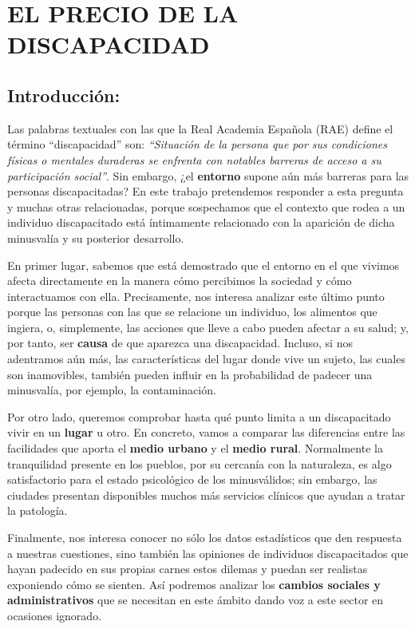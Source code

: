 \documentclass[
]{article}
\begin{document}
\hypertarget{el-precio-de-la-discapacidad}{%
\section{EL PRECIO DE LA
DISCAPACIDAD}\label{el-precio-de-la-discapacidad}}

\hypertarget{introducciuxf3n}{%
\subsection{Introducción:}\label{introducciuxf3n}}

Las palabras textuales con las que la Real Academia Española (RAE)
define el término ``discapacidad'' son: \emph{``Situación de la persona
que por sus condiciones físicas o mentales duraderas se enfrenta con
notables barreras de acceso a su participación social''}. Sin embargo,
¿el \textbf{entorno} supone aún más barreras para las personas
discapacitadas? En este trabajo pretendemos responder a esta pregunta y
muchas otras relacionadas, porque sospechamos que el contexto que rodea
a un individuo discapacitado está íntimamente relacionado con la
aparición de dicha minusvalía y su posterior desarrollo.

En primer lugar, sabemos que está demostrado que el entorno en el que
vivimos afecta directamente en la manera cómo percibimos la sociedad y
cómo interactuamos con ella. Precisamente, nos interesa analizar este
último punto porque las personas con las que se relacione un individuo,
los alimentos que ingiera, o, simplemente, las acciones que lleve a cabo
pueden afectar a su salud; y, por tanto, ser \textbf{causa} de que
aparezca una discapacidad. Incluso, si nos adentramos aún más, las
características del lugar donde vive un sujeto, las cuales son
inamovibles, también pueden influir en la probabilidad de padecer una
minusvalía, por ejemplo, la contaminación.

Por otro lado, queremos comprobar hasta qué punto limita a un
discapacitado vivir en un \textbf{lugar} u otro. En concreto, vamos a
comparar las diferencias entre las facilidades que aporta el
\textbf{medio urbano} y el \textbf{medio rural}. Normalmente la
tranquilidad presente en los pueblos, por su cercanía con la naturaleza,
es algo satisfactorio para el estado psicológico de los minusválidos;
sin embargo, las ciudades presentan disponibles muchos más servicios
clínicos que ayudan a tratar la patología.

Finalmente, nos interesa conocer no sólo los datos estadísticos que den
respuesta a nuestras cuestiones, sino también las opiniones de
individuos discapacitados que hayan padecido en sus propias carnes estos
dilemas y puedan ser realistas exponiendo cómo se sienten. Así podremos
analizar los \textbf{cambios sociales y administrativos} que se
necesitan en este ámbito dando voz a este sector en ocasiones ignorado.
\end{document}
